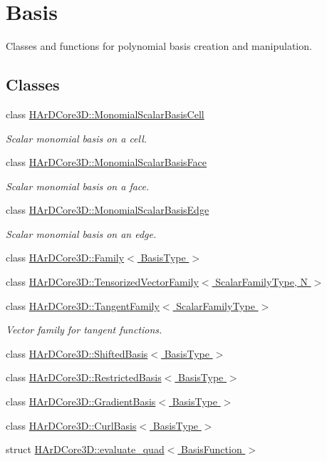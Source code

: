 \hypertarget{group__Basis}{}\section{Basis}
\label{group__Basis}


Classes and functions for polynomial basis creation and manipulation.  


\subsection*{Classes}
\begin{DoxyCompactItemize}
\item 
class \hyperlink{classHArDCore3D_1_1MonomialScalarBasisCell}{H\+Ar\+D\+Core3\+D\+::\+Monomial\+Scalar\+Basis\+Cell}
\begin{DoxyCompactList}\small\item\em Scalar monomial basis on a cell. \end{DoxyCompactList}\item 
class \hyperlink{classHArDCore3D_1_1MonomialScalarBasisFace}{H\+Ar\+D\+Core3\+D\+::\+Monomial\+Scalar\+Basis\+Face}
\begin{DoxyCompactList}\small\item\em Scalar monomial basis on a face. \end{DoxyCompactList}\item 
class \hyperlink{classHArDCore3D_1_1MonomialScalarBasisEdge}{H\+Ar\+D\+Core3\+D\+::\+Monomial\+Scalar\+Basis\+Edge}
\begin{DoxyCompactList}\small\item\em Scalar monomial basis on an edge. \end{DoxyCompactList}\item 
class \hyperlink{classHArDCore3D_1_1Family}{H\+Ar\+D\+Core3\+D\+::\+Family$<$ Basis\+Type $>$}
\item 
class \hyperlink{classHArDCore3D_1_1TensorizedVectorFamily}{H\+Ar\+D\+Core3\+D\+::\+Tensorized\+Vector\+Family$<$ Scalar\+Family\+Type, N $>$}
\item 
class \hyperlink{classHArDCore3D_1_1TangentFamily}{H\+Ar\+D\+Core3\+D\+::\+Tangent\+Family$<$ Scalar\+Family\+Type $>$}
\begin{DoxyCompactList}\small\item\em Vector family for tangent functions. \end{DoxyCompactList}\item 
class \hyperlink{classHArDCore3D_1_1ShiftedBasis}{H\+Ar\+D\+Core3\+D\+::\+Shifted\+Basis$<$ Basis\+Type $>$}
\item 
class \hyperlink{classHArDCore3D_1_1RestrictedBasis}{H\+Ar\+D\+Core3\+D\+::\+Restricted\+Basis$<$ Basis\+Type $>$}
\item 
class \hyperlink{classHArDCore3D_1_1GradientBasis}{H\+Ar\+D\+Core3\+D\+::\+Gradient\+Basis$<$ Basis\+Type $>$}
\item 
class \hyperlink{classHArDCore3D_1_1CurlBasis}{H\+Ar\+D\+Core3\+D\+::\+Curl\+Basis$<$ Basis\+Type $>$}
\item 
struct \hyperlink{structHArDCore3D_1_1evaluate__quad}{H\+Ar\+D\+Core3\+D\+::evaluate\+\_\+quad$<$ Basis\+Function $>$}
\end{DoxyCompactItemize}
